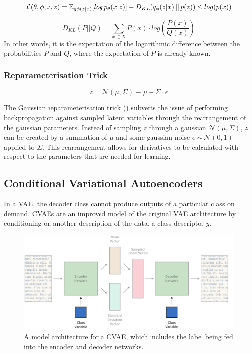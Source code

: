 \documentclass[12pt,twoside]{report}
\begin{document}
\begin{equation}
	\label{eqn:elbo}
	\mathcal{L}(\theta, \phi, x, z) = \mathbb{E}_{q \phi (z|x)}[log \thinspace p_{\theta}(x|z)] - D_{KL}(q_{\phi}(z|x)\thinspace||\thinspace p(z)) \leq log (p(x))
\end{equation}

\begin{equation}
	\label{eqn:kl_divergence}
D_{KL}(P ||Q) = \sum_{x \subset X} P(x) \cdot log (\frac{P(x)}{Q(x)})
\end{equation}
In other words, it is the expectation of the logarithmic difference between the probabilities $P$ and $Q$, where the expectation of $P$ is already known.

\subsubsection*{Reparameterisation Trick}

$$z = \mathcal{N}(\mu, \Sigma) \equiv \mu + \Sigma \cdot \epsilon $$ 


The Gaussian reparameterisation trick (\cite{kingma_auto-encoding_2013}) subverts the issue of performing backpropagation against sampled latent variables through the rearrangement of the gaussian parameters. Instead of sampling $z$ through a gaussian $\mathcal{N}(\mu, \Sigma)$, $z$ can be created by a summation of $\mu$ and some gaussian noise $\epsilon \sim \mathcal{N}(0,1)$ applied to $\Sigma$. This rearrangement allows for derivatives to be calculated with respect to the parameters that are needed for learning.


\subsection{Conditional Variational Autoencoders}

In a VAE, the decoder class cannot produce outputs of a particular class on demand. CVAEs are an improved model of the original VAE architecture by conditioning on another description of the data, a class descriptor $y$. 

\begin{figure}[!ht]
      
	\centering
	\includegraphics[width=150mm]{diagrams/conditional_variational_autoencoders.pdf}
	\caption{A model architecture for a CVAE, which includes the label being fed into the encoder and decoder networks. \label{cvae_diagram}}
  \end{figure}
\end{document}
